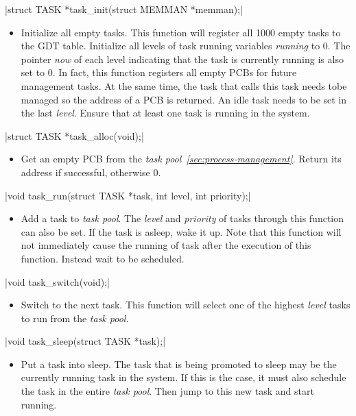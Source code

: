 \documentclass{swfcthesis}
\begin{document}
\csingle|struct TASK *task_init(struct MEMMAN *memman);|
\begin{itemize}
\item Initialize all empty tasks. This
  function will register all 1000 empty tasks to the GDT table. Initialize all levels of
  task running variables \emph{running} to 0. The pointer \emph{now} of each level
  indicating that the task is currently running is also set to 0. In fact, this function
  registers all empty PCBs for future management tasks. At the same time, the task that
  calls this task needs tobe managed so the address of a PCB is returned. An idle task
  needs to be set in the last \emph{level}. Ensure that at least one task is running in the
  system.
  
\end{itemize}

\csingle|struct TASK *task_alloc(void);|
\begin{itemize}
\item Get an empty PCB from the \emph{task pool~\ref{sec:process-management}}. Return
  its address if successful, otherwise 0. 
  
\end{itemize}

\csingle|void task_run(struct TASK *task, int level, int priority);|
\begin{itemize}
\item Add a task to \emph{task pool}. The \emph{level} and \emph{priority} of tasks
  through this function can also be set. If the task is asleep, wake it up. Note that this
  function will not immediately cause the running of task after the execution of this
  function. Instead wait to be scheduled.
\end{itemize}

\csingle|void task_switch(void);|
\begin{itemize}
\item Switch to the next task. This function will select one of the highest \emph{level}
  tasks to run from the \emph{task pool}. 
  
\end{itemize}

\csingle|void task_sleep(struct TASK *task);|
\begin{itemize}
\item Put a task into sleep. The task that is being promoted to sleep may be the currently
  running task in the system. If this is the case, it must also schedule the task in
  the entire \emph{task pool}. Then jump to this new task and start running.
      
\end{itemize}
\end{document}
